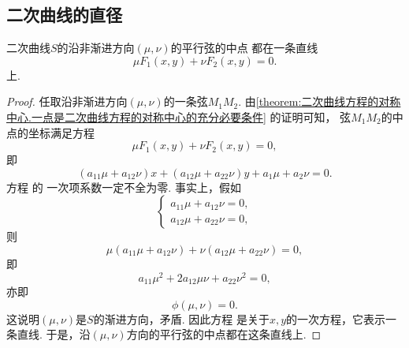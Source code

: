 \subsection{二次曲线的直径}
\begin{theorem}\label{theorem:二次曲线方程的直径和对称轴.二次曲线沿非渐进方向的平行弦的中垂线}
二次曲线\(S\)的沿非渐进方向\((\mu,\nu)\)的平行弦的中点
都在一条直线\begin{equation}\label{equation:二次曲线方程的直径和对称轴.二次曲线沿非渐进方向的平行弦的中垂线1}
	\mu F_1(x,y) + \nu F_2(x,y) = 0.
\end{equation}上.
\begin{proof}
任取沿非渐进方向\((\mu,\nu)\)的一条弦\(M_1 M_2\).
由\cref{theorem:二次曲线方程的对称中心.一点是二次曲线方程的对称中心的充分必要条件} 的证明可知，
弦\(M_1 M_2\)的中点的坐标满足方程\begin{equation*}
	\mu F_1(x,y) + \nu F_2(x,y) = 0,
\end{equation*}
即\begin{equation}\label{equation:二次曲线方程的直径和对称轴.二次曲线沿非渐进方向的平行弦的中垂线2}
	(a_{11} \mu + a_{12} \nu) x
	+ (a_{12} \mu + a_{22} \nu) y
	+ a_1 \mu + a_2 \nu
	= 0.
\end{equation}
方程  的
一次项系数一定不全为零.
事实上，假如\begin{equation*}
	\left\{ \begin{array}{l}
		a_{11} \mu + a_{12} \nu = 0, \\
		a_{12} \mu + a_{22} \nu = 0,
	\end{array} \right.
\end{equation*}
则\begin{equation*}
	\mu (a_{11} \mu + a_{12} \nu) + \nu (a_{12} \mu + a_{22} \nu) = 0,
\end{equation*}
即\begin{equation*}
	a_{11} \mu^2 + 2 a_{12} \mu \nu + a_{22} \nu^2 = 0,
\end{equation*}
亦即\begin{equation*}
	\phi(\mu,\nu) = 0.
\end{equation*}
这说明\((\mu,\nu)\)是\(S\)的渐进方向，矛盾.
因此方程 
是关于\(x,y\)的一次方程，它表示一条直线.
于是，沿\((\mu,\nu)\)方向的平行弦的中点都在这条直线上.
\end{proof}
\end{theorem}


